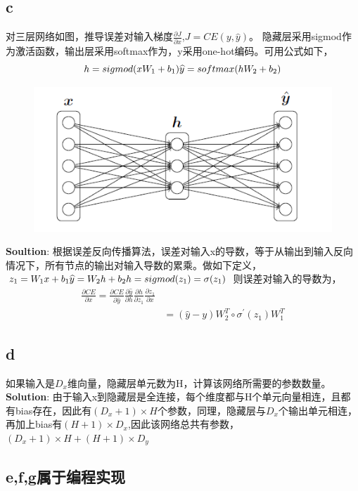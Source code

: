 \documentclass[twoside,nofonts,fancyhdr,openany,UTF8,fleqn]{ctexart} %
\begin{document}
\subsection{c}
对三层网络如图，推导误差对输入梯度$\frac{\partial{J}}{\partial{x}}$,$J=CE(y,\widehat{y})$。
隐藏层采用sigmod作为激活函数，输出层采用softmax作为，y采用one-hot编码。可用公式如下，
$$h = sigmod(xW_1 + b_1) \\ \widehat{y} = softmax(hW_2 + b_2)$$
\begin{figure}[!htb]
\includegraphics[scale=0.5]{assign_1}
\centering
\caption{}
\end{figure}

\textbf{Soultion}:
根据误差反向传播算法，误差对输入x的导数，等于从输出到输入反向情况下，所有节点的输出对输入导数的累乘。做如下定义，
$z_1 = W_1x + b_1 \\ \widehat{y}=W_2h + b_2 \\ h = sigmod(z_1)=\sigma(z_1)$
则误差对输入的导数为，
\begin{align}
\frac{\partial{CE}}{\partial{x}} = \frac{\partial{CE}}{\partial{\widehat{y}}}\frac{\partial{\widehat{y}}}{\partial{h}}\frac{\partial{h}}{\partial{z_1}}\frac{\partial{z_1}}{\partial{x}} \\ 
	& = (\widehat{y}-y)W_{2}^{T}\circ\sigma^{\prime}(z_1)W_{1}^{T}
\end{align}

\subsection{d}
如果输入是$D_x$维向量，隐藏层单元数为H，计算该网络所需要的参数数量。
\textbf{Solution}:
由于输入x到隐藏层是全连接，每个维度都与H个单元向量相连，且都有bias存在，因此有$(D_x + 1)\times H$个参数，同理，隐藏层与$D_x$个输出单元相连，再加上bias有$(H + 1)\times D_x$,因此该网络总共有参数，$(D_x +1)\times H + (H+1)\times D_y$
\subsection{e,f,g属于编程实现}
\end{document}
